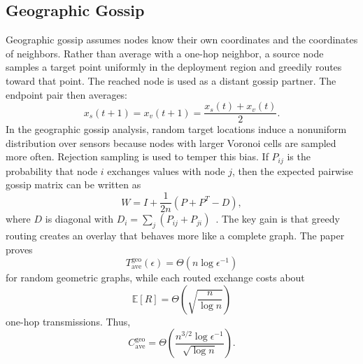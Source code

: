 \documentclass[conference]{IEEEtran}
\begin{document}
\subsection{Geographic Gossip}
Geographic gossip assumes nodes know their own coordinates and the coordinates of neighbors. Rather than average with a one-hop neighbor, a source node samples a target point uniformly in the deployment region and greedily routes toward that point. The reached node is used as a distant gossip partner. The endpoint pair then averages:
\begin{equation}
    x_s(t+1)=x_v(t+1)=\frac{x_s(t)+x_v(t)}{2}.
\end{equation}
In the geographic gossip analysis, random target locations induce a nonuniform distribution over sensors because nodes with larger Voronoi cells are sampled more often. Rejection sampling is used to temper this bias. If $P_{ij}$ is the probability that node $i$ exchanges values with node $j$, then the expected pairwise gossip matrix can be written as
\begin{equation}
    W = I + \frac{1}{2n}(P+P^T-D),
\end{equation}
where $D$ is diagonal with $D_i=\sum_j(P_{ij}+P_{ji})$~\cite{dimakis2006geographic}. The key gain is that greedy routing creates an overlay that behaves more like a complete graph. The paper proves
\begin{equation}
    T_{\mathrm{ave}}^{\mathrm{geo}}(\epsilon)
    = \Theta(n\log\epsilon^{-1})
\end{equation}
for random geometric graphs, while each routed exchange costs about
\begin{equation}
    \mathbb{E}[R] = \Theta\left(\sqrt{\frac{n}{\log n}}\right)
\end{equation}
one-hop transmissions. Thus,
\begin{equation}
    C_{\mathrm{ave}}^{\mathrm{geo}}
    = \Theta\left(
    \frac{n^{3/2}\log\epsilon^{-1}}{\sqrt{\log n}}
    \right).
\end{equation}
\end{document}
